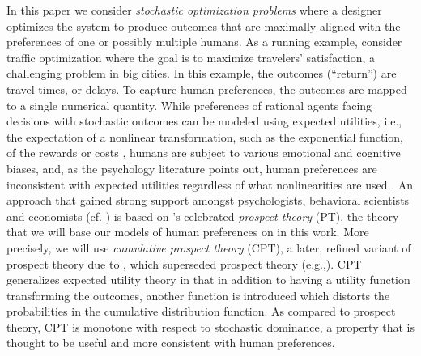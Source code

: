 In this paper we consider \emph{stochastic optimization problems}
where a designer optimizes the system 
to produce outcomes that are maximally aligned with the preferences of 
one or possibly multiple humans.
As a running example, consider traffic optimization where the goal is to maximize
travelers' satisfaction, a challenging problem 
in big cities.
In this example, the outcomes (``return'') are travel times, or delays. 
To capture human preferences, the outcomes are mapped to a single numerical quantity.
While preferences of rational agents facing decisions with stochastic outcomes can be modeled using expected utilities,
i.e., the expectation of a nonlinear transformation, such as the exponential function, of the rewards or costs
\cite{NeuMo44,fishburn1970expectedutility}, 
	humans are subject to various emotional and cognitive biases,
	and, as the psychology literature points out, human preferences 
	are inconsistent with expected utilities regardless of what nonlinearities are used
	 \cite{allais53,ellsberg61,kahneman1979prospect}.
An approach that gained 
	strong support amongst psychologists, behavioral scientists and economists (cf. \cite{starmer2000developments,quiggin2012generalized})
	is based on \cite{kahneman1979prospect}'s celebrated \emph{prospect theory} (PT),
	the theory that we will base our models of human preferences on
	 in this work.
More precisely, we will use \emph{cumulative prospect theory} (CPT),
 	a later, refined variant of prospect theory due to \cite{tversky1992advances}, 
	which superseded prospect theory (e.g.,\cite{Barberis:2012vs}).
CPT generalizes expected utility theory in that in addition to having a utility function transforming
	the outcomes, another function is introduced which distorts the probabilities in the cumulative distribution function.
As compared to prospect theory, CPT is monotone with respect to stochastic dominance, a property
	that is thought to be useful and more consistent with human preferences.
	

